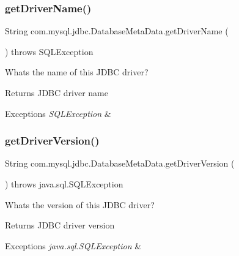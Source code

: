 \subsubsection{\texorpdfstring{get\+Driver\+Name()}{getDriverName()}}
{\footnotesize\ttfamily String com.\+mysql.\+jdbc.\+Database\+Meta\+Data.\+get\+Driver\+Name (\begin{DoxyParamCaption}{ }\end{DoxyParamCaption}) throws S\+Q\+L\+Exception}

What\textquotesingle{}s the name of this J\+D\+BC driver?

\begin{DoxyReturn}{Returns}
J\+D\+BC driver name 
\end{DoxyReturn}

\begin{DoxyExceptions}{Exceptions}
{\em S\+Q\+L\+Exception} & \\
\hline
\end{DoxyExceptions}
\mbox{\label{classcom_1_1mysql_1_1jdbc_1_1_database_meta_data_ae5981a4937e8df7a5ff660c7e55cd939}} 
\subsubsection{\texorpdfstring{get\+Driver\+Version()}{getDriverVersion()}}
{\footnotesize\ttfamily String com.\+mysql.\+jdbc.\+Database\+Meta\+Data.\+get\+Driver\+Version (\begin{DoxyParamCaption}{ }\end{DoxyParamCaption}) throws java.\+sql.\+S\+Q\+L\+Exception}

What\textquotesingle{}s the version of this J\+D\+BC driver?

\begin{DoxyReturn}{Returns}
J\+D\+BC driver version 
\end{DoxyReturn}

\begin{DoxyExceptions}{Exceptions}
{\em java.\+sql.\+S\+Q\+L\+Exception} & \\
\hline
\end{DoxyExceptions}
\mbox{\label{classcom_1_1mysql_1_1jdbc_1_1_database_meta_data_a17c160fdaac4749922b8ec683b4ab138}} 
